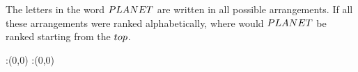 



\question[3] The letters in the word $PLANET$ are written in all possible 
arrangements. If all these arrangements were ranked alphabetically, where
would $PLANET$ be ranked starting from the $top$.


\watchout

\ifprintanswers
  \begin{marginfigure}
      :(0,0)
      :(0,0)
    \figdrawbegin{}
      \figdrawline [100,101]
    \figdrawend
    \figvisu{\figBoxA}{}{%
    }
    \centerline{\box\figBoxA}
  \end{marginfigure}
\fi 

